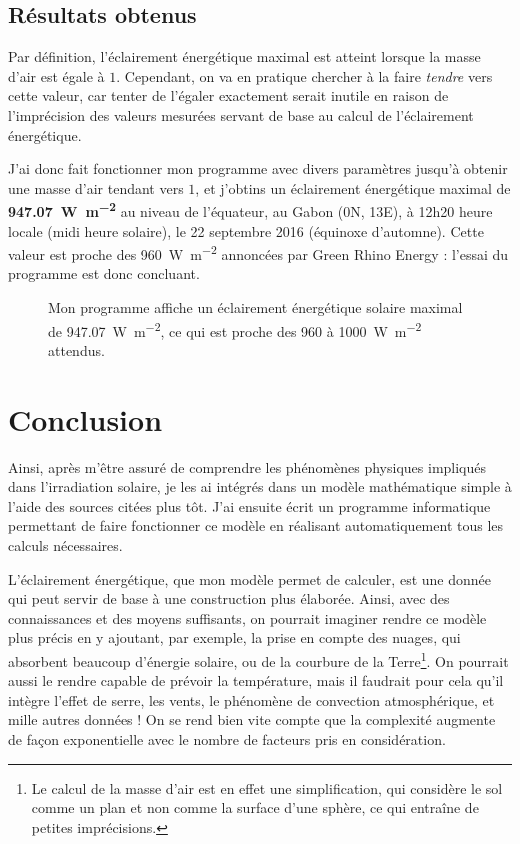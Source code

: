 \documentclass[12pt]{article}
\begin{document}
\subsection{Résultats obtenus}

Par définition, l'éclairement énergétique maximal est atteint lorsque la masse d'air est égale à $1$.
Cependant, on va en pratique chercher à la faire \emph{tendre} vers cette valeur, car tenter de l'égaler exactement serait inutile en raison de l'imprécision des valeurs mesurées servant de base au calcul de l'éclairement énergétique.

J'ai donc fait fonctionner mon programme avec divers paramètres jusqu'à obtenir une masse d'air tendant vers $1$, et j'obtins un éclairement énergétique maximal de \textbf{\SI{947.07}{\watt\per\square\meter}} au niveau de l'équateur, au Gabon (0\degree N, 13\degree E), à 12h20 heure locale (midi heure solaire), le 22 septembre 2016 (équinoxe d'automne).
Cette valeur est proche des \SI{960}{\watt\per\square\meter} annoncées par Green Rhino Energy : l'essai du programme est donc concluant.

\begin{figure}[!ht]
  \centering
  \caption{Mon programme affiche un éclairement énergétique solaire maximal de \SI{947.07}{\watt\per\square\meter}, ce qui est proche des 960 à \SI{1000}{\watt\per\square\meter} attendus.}
  \label{fig:maximum}
\end{figure}



\clearpage
\section{Conclusion}

Ainsi, après m'être assuré de comprendre les phénomènes physiques impliqués dans l'irradiation solaire, je les ai intégrés dans un modèle mathématique simple à l'aide des sources citées plus tôt. J'ai ensuite écrit un programme informatique permettant de faire fonctionner ce modèle en réalisant automatiquement tous les calculs nécessaires.

L'éclairement énergétique, que mon modèle permet de calculer, est une donnée qui peut servir de base à une construction plus élaborée.
Ainsi, avec des connaissances et des moyens suffisants, on pourrait imaginer rendre ce modèle plus précis en y ajoutant, par exemple, la prise en compte des nuages, qui absorbent beaucoup d'énergie solaire, ou de la courbure de la Terre\footnote{Le calcul de la masse d'air est en effet une simplification, qui considère le sol comme un plan et non comme la surface d'une sphère, ce qui entraîne de petites imprécisions.}.
On pourrait aussi le rendre capable de prévoir la température, mais il faudrait pour cela qu'il intègre l'effet de serre, les vents, le phénomène de convection atmosphérique, et mille autres données !
On se rend bien vite compte que la complexité augmente de façon exponentielle avec le nombre de facteurs pris en considération.
\end{document}
